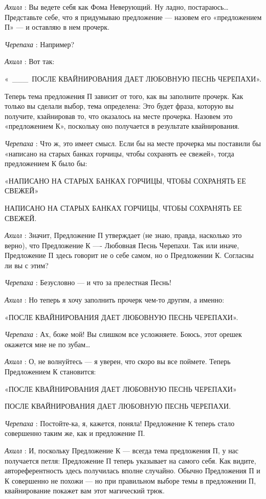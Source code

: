 \emph{Ахилл} : Вы ведете себя как Фома Неверующий. Ну ладно, постараюсь\ldots{} Представьте себе, что я придумываю предложение --- назовем его «предложением П» --- и оставляю в нем прочерк.

\emph{Черепаха} : Например?

\emph{Ахилл} : Вот так:

«~\_\_\_~ПОСЛЕ КВАЙНИРОВАНИЯ ДАЕТ ЛЮБОВНУЮ ПЕСНЬ ЧЕРЕПАХИ».

Теперь тема предложения П зависит от того, как вы заполните прочерк. Как только вы сделали выбор, тема определена: Это будет фраза, которую вы получите, кзайнировав то, что оказалось на месте прочерка. Назовем это «предложением К», поскольку оно получается в результате квайнирования.

\emph{Черепаха} : Что ж, это имеет смысл. Если бы на месте прочерка мы поставили бы «написано на старых банках горчицы, чтобы сохранять ее свежей», тогда предложением К было бы:

«НАПИСАНО НА СТАРЫХ БАНКАХ ГОРЧИЦЫ, ЧТОБЫ СОХРАНЯТЬ ЕЕ СВЕЖЕЙ»

НАПИСАНО НА СТАРЫХ БАНКАХ ГОРЧИЦЫ, ЧТОБЫ СОХРАНЯТЬ ЕЕ СВЕЖЕЙ.

\emph{Ахилл} : Значит, Предложение П утверждает (не знаю, правда, насколько это верно), что Предложение К ---- Любовная Песнь Черепахи. Так или иначе, Предложение П здесь говорит не о себе самом, но о Предложении К. Согласны ли вы с этим?

\emph{Черепаха} : Безусловно --- и что за прелестная Песнь!

\emph{Ахилл} : Но теперь я хочу заполнить прочерк чем-то другим, а именно:

«ПОСЛЕ КВАЙНИРОВАНИЯ ДАЕТ ЛЮБОВНУЮ ПЕСНЬ ЧЕРЕПАХИ».

\emph{Черепаха} : Ах, боже мой! Вы слишком все усложняете. Боюсь, этот орешек окажется мне не по зубам\ldots{}

\emph{Ахилл} : О, не волнуйтесь --- я уверен, что скоро вы все поймете. Теперь Предложением К становится:

«ПОСЛЕ КВАЙНИРОВАНИЯ ДАЕТ ЛЮБОВНУЮ ПЕСНЬ ЧЕРЕПАХИ»

ПОСЛЕ КВАЙНИРОВАНИЯ ДАЕТ ЛЮБОВНУЮ ПЕСНЬ ЧЕРЕПАХИ.

\emph{Черепаха} : Постойте-ка, я, кажется, поняла! Предложение К теперь стало совершенно таким же, как и предложение П.

\emph{Ахилл} : И, поскольку Предложение К --- всегда тема предложения П, у нас получается петля: Предложение П теперь указывает на самого себя. Как видите, автореферентность здесь получилась вполне случайно. Обычно Предложения П и К совершенно не похожи --- но при правильном выборе темы в предложении П, квайнирование покажет вам этот магический трюк.

